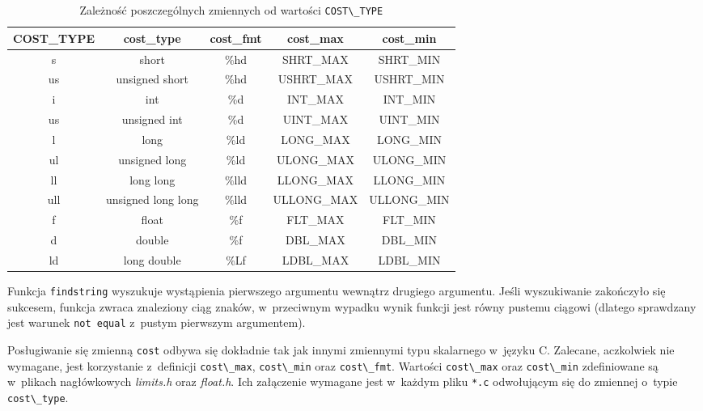 \documentclass[a4paper,12pt,polish,oneside,openright]{thesis}
\newcommand\code[1]{\lstinline[style=line]{#1}}
\begin{document}
\begin{table}[htb]
\caption{Zależność poszczególnych zmiennych od wartości \code{COST\_TYPE}}
\label{tab:dep}
\begin{tabular}{ | c | c | c | c | c | }
	\hline
	COST\_TYPE  & cost\_type            & cost\_fmt  & cost\_max      & cost\_min      \\
	\hline \hline
	s           & short                 & \%hd       & SHRT\_MAX      & SHRT\_MIN      \\ \hline
	us          & unsigned short        & \%hd       & USHRT\_MAX     & USHRT\_MIN     \\ \hline
	i           & int                   & \%d        & INT\_MAX       & INT\_MIN       \\ \hline
	us          & unsigned int          & \%d        & UINT\_MAX      & UINT\_MIN      \\ \hline
	l           & long                  & \%ld       & LONG\_MAX      & LONG\_MIN      \\ \hline
	ul          & unsigned long         & \%ld       & ULONG\_MAX     & ULONG\_MIN     \\ \hline
	ll          & long long             & \%lld      & LLONG\_MAX     & LLONG\_MIN     \\ \hline
	ull         & unsigned long long    & \%lld      & ULLONG\_MAX    & ULLONG\_MIN    \\ \hline
	f           & float                 & \%f        & FLT\_MAX       & FLT\_MIN       \\ \hline
	d           & double                & \%f        & DBL\_MAX       & DBL\_MIN       \\ \hline
	ld          & long double           & \%Lf       & LDBL\_MAX      & LDBL\_MIN      \\ \hline
\end{tabular}
\end{table}

Funkcja \code{findstring} wyszukuje wystąpienia pierwszego argumentu wewnątrz drugiego argumentu.
Jeśli wyszukiwanie zakończyło się sukcesem, funkcja zwraca znaleziony ciąg znaków, w~przeciwnym wypadku wynik funkcji jest równy pustemu ciągowi (dlatego sprawdzany jest warunek \code{not equal} z~pustym pierwszym argumentem).

Posługiwanie się zmienną \code{cost} odbywa się dokładnie tak jak innymi zmiennymi typu skalarnego w~języku C.
Zalecane, aczkolwiek nie wymagane, jest korzystanie z~definicji \code{cost\_max}, \code{cost\_min} oraz \code{cost\_fmt}.
Wartości \code{cost\_max} oraz \code{cost\_min} zdefiniowane są w~plikach nagłówkowych \emph{limits.h} oraz \emph{float.h}. Ich załączenie wymagane jest w~każdym pliku \code{*.c} odwołującym się do zmiennej o~typie \code{cost\_type}.
\end{document}
